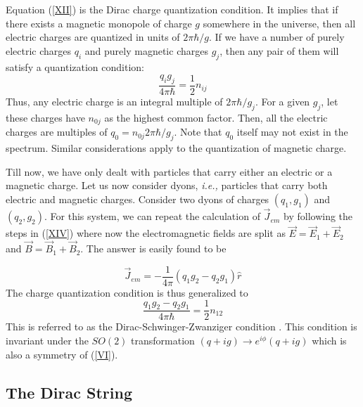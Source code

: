 Equation (\ref{XII}) is the Dirac charge quantization
condition. It implies that if there exists a magnetic monopole of
charge $g$ somewhere in the universe, then all electric charges are
quantized in units of $2\pi\hbar/g$. If we have a number of purely
electric charges $q_i$ and purely magnetic charges $g_j$, then any
pair of them will satisfy a quantization condition:
\begin{equation}
\frac{q_{i}g_{j}}{4 \pi \hbar} = \frac{1}{2} n_{ij}
\label{XIII}
\end{equation}
Thus, any electric charge is an integral multiple of $2\pi\hbar/g_j$.
For a given $g_j$, let these charges have $n_{0j}$ as the highest
common factor. Then, all the electric charges are multiples
of $q_{0}=n_{0j}2\pi\hbar /g_{j}$. Note that $q_0$ itself may not
exist in the spectrum. Similar considerations apply to the
quantization of magnetic charge. 

Till now, we have only dealt with particles that carry either an
electric or a magnetic charge. Let us now consider dyons, {\it i.e.,}
particles that carry both electric and magnetic charges. Consider two
dyons of charges $(q_1,g_1)$ and $(q_2,g_2)$. For this system, we can
repeat the calculation of $\vec{J}_{em}$ by following the steps in
(\ref{XIV}) where now the electromagnetic fields are split as
$\vec{E}=\vec{E}_1+\vec{E}_2$ and $\vec{B}=\vec{B}_1+ \vec{B}_2$.  The
answer is easily found to be

\begin{equation}
\vec{J}_{em}=-\frac{1}{4\pi}\left(q_1 g_2 - q_2 g_1\right)\hat{r} 
\label{Jemd}
\end{equation}
The charge quantization condition is thus generalized to 
\begin{equation}
\frac{q_1 g_2 - q_2 g_1}{4\pi\hbar}=\frac{1}{2} n_{12}
\label{DSZ}
\end{equation}
This is referred to as the Dirac-Schwinger-Zwanziger condition
\cite{Schwinger,Zwanziger}. This condition is invariant under the
$SO(2)$ transformation $(q+ig)\rightarrow e^{i\phi}(q+ig)$ which is
also a symmetry of (\ref{VI}). 

\subsection{The Dirac String}

